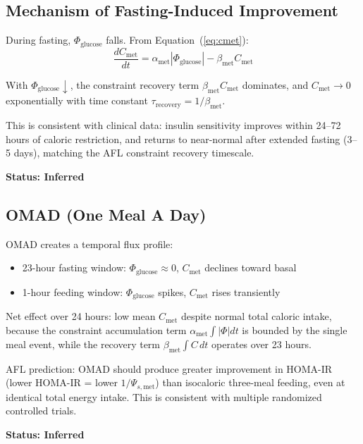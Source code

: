 \documentclass[11pt]{article}
\begin{document}
\subsection{Mechanism of Fasting-Induced Improvement}

During fasting, $\Phi_{\mathrm{glucose}}$ falls. From Equation~(\ref{eq:cmet}):
\begin{equation}
    \frac{dC_{\mathrm{met}}}{dt} = \alpha_{\mathrm{met}} |\Phi_{\mathrm{glucose}}| - \beta_{\mathrm{met}} C_{\mathrm{met}}
\end{equation}

With $\Phi_{\mathrm{glucose}} \downarrow$, the constraint recovery term $\beta_{\mathrm{met}} C_{\mathrm{met}}$ dominates, and $C_{\mathrm{met}} \to 0$ exponentially with time constant $\tau_{\mathrm{recovery}} = 1/\beta_{\mathrm{met}}$.

This is consistent with clinical data: insulin sensitivity improves within 24--72 hours of caloric restriction, and returns to near-normal after extended fasting (3--5 days), matching the AFL constraint recovery timescale.

\textbf{Status: Inferred}

\subsection{OMAD (One Meal A Day)}

OMAD creates a temporal flux profile:
\begin{itemize}
    \item 23-hour fasting window: $\Phi_{\mathrm{glucose}} \approx 0$, $C_{\mathrm{met}}$ declines toward basal
    \item 1-hour feeding window: $\Phi_{\mathrm{glucose}}$ spikes, $C_{\mathrm{met}}$ rises transiently
\end{itemize}

Net effect over 24 hours: low mean $C_{\mathrm{met}}$ despite normal total caloric intake, because the constraint accumulation term $\alpha_{\mathrm{met}} \int |\Phi| dt$ is bounded by the single meal event, while the recovery term $\beta_{\mathrm{met}} \int C\, dt$ operates over 23 hours.

AFL prediction: OMAD should produce greater improvement in HOMA-IR (lower HOMA-IR = lower $1/\Psi_{s,\mathrm{met}}$) than isocaloric three-meal feeding, even at identical total energy intake. This is consistent with multiple randomized controlled trials.

\textbf{Status: Inferred}
\end{document}

